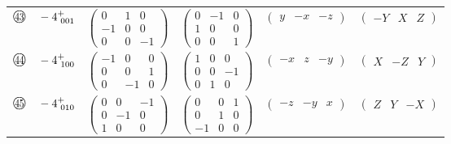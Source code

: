 \documentclass[fleqn,10pt,landscape]{jsarticle}
\begin{document}
\begin{center}
\begin{longtable}{lcccc}
$ {\ooalign{\hfil\resizebox{.8\width}{\height}{43}\hfil\crcr\raise.1ex\hbox{\large$\bigcirc$}}}\quad -4^{+}_{\,\,001} $ & $ \begin{pmatrix} 0 & 1 & 0 \\ -1 & 0 & 0 \\ 0 & 0 & -1 \end{pmatrix} $ & $ \begin{pmatrix} 0 & -1 & 0 \\ 1 & 0 & 0 \\ 0 & 0 & 1 \end{pmatrix} $ & $ \begin{pmatrix} y & - x & - z \end{pmatrix} $ & $ \begin{pmatrix} - Y & X & Z \end{pmatrix} $ \\
$ {\ooalign{\hfil\resizebox{.8\width}{\height}{44}\hfil\crcr\raise.1ex\hbox{\large$\bigcirc$}}}\quad -4^{+}_{\,\,100} $ & $ \begin{pmatrix} -1 & 0 & 0 \\ 0 & 0 & 1 \\ 0 & -1 & 0 \end{pmatrix} $ & $ \begin{pmatrix} 1 & 0 & 0 \\ 0 & 0 & -1 \\ 0 & 1 & 0 \end{pmatrix} $ & $ \begin{pmatrix} - x & z & - y \end{pmatrix} $ & $ \begin{pmatrix} X & - Z & Y \end{pmatrix} $ \\
$ {\ooalign{\hfil\resizebox{.8\width}{\height}{45}\hfil\crcr\raise.1ex\hbox{\large$\bigcirc$}}}\quad -4^{+}_{\,\,010} $ & $ \begin{pmatrix} 0 & 0 & -1 \\ 0 & -1 & 0 \\ 1 & 0 & 0 \end{pmatrix} $ & $ \begin{pmatrix} 0 & 0 & 1 \\ 0 & 1 & 0 \\ -1 & 0 & 0 \end{pmatrix} $ & $ \begin{pmatrix} - z & - y & x \end{pmatrix} $ & $ \begin{pmatrix} Z & Y & - X \end{pmatrix} $ \\

\end{longtable}
\end{center}
\end{document}
